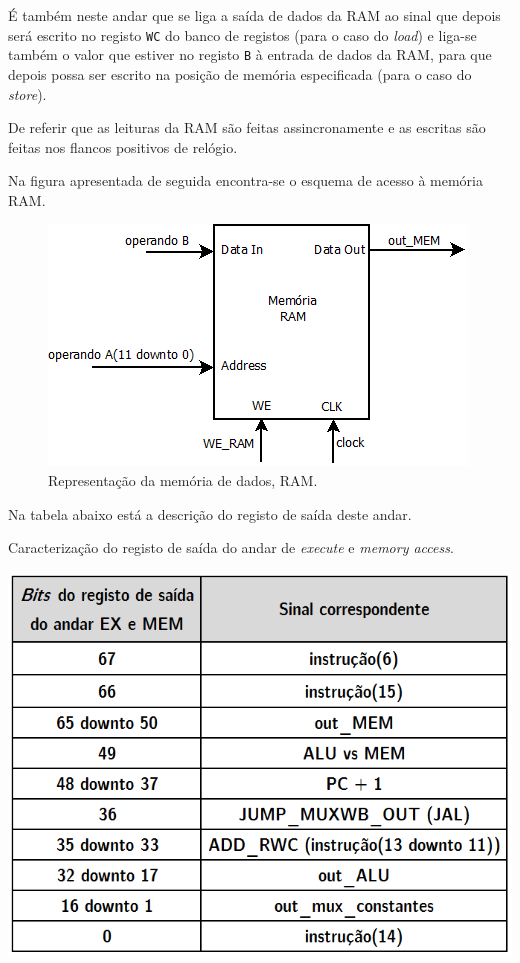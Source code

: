 \documentclass[11pt]{article}
\numberwithin{equation}{section}
\begin{document}
É também neste andar que se liga a saída de dados da RAM ao sinal que depois será escrito no registo \texttt{WC} do banco de registos (para o caso do \textit{load}) e liga-se também o valor que estiver no registo \texttt{B} à entrada de dados da RAM, para que depois possa ser escrito na posição de memória especificada (para o caso do \textit{store}).

De referir que as leituras da RAM são feitas assincronamente e as escritas são feitas nos flancos positivos de relógio.

Na figura apresentada de seguida encontra-se o esquema de acesso à memória RAM.

\begin{figure}[H]
	\centering
	\includegraphics[keepaspectratio=true, scale=0.55]{imagens/RAM}
	\caption{Representação da memória de dados, RAM.}
	\vspace{-0.8em}
\end{figure}

Na tabela abaixo está a descrição do registo de saída deste andar.

\begin{table}[h]
	\centering
	\caption{Caracterização do registo de saída do andar de \textit{execute} e \textit{memory access}.}
	\vspace{-2mm}
 	\includegraphics[keepaspectratio=true, scale=0.45]{tabelas/regEXMEM}
\end{table}
\end{document}

